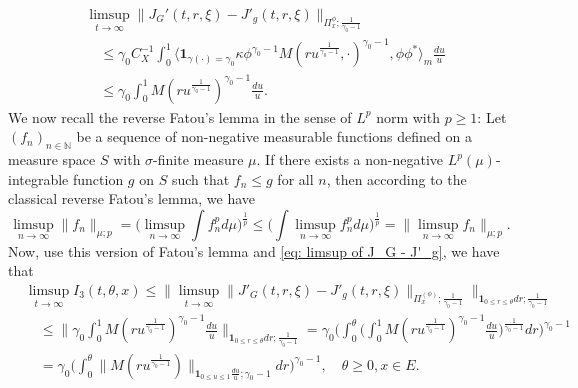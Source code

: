 \documentclass[12pt, a4paper]{amsart}
\theoremstyle{definition}
\numberwithin{equation}{section}
\begin{document}
\[\label{eq: limsup of J_G - J'_g}\begin{split}
	&\limsup_{t\to \infty} \| J_G'(t,r,\xi) - J'_g(t,r,\xi) \|_{\Pi_x^{\phi};\frac{1}{\gamma_0 - 1}}
	\\&\quad\leq  \gamma_0 C_X^{-1} \int_0^1 \big\langle \mathbf 1_{\gamma(\cdot) = \gamma_0} \kappa \phi^{\gamma_0 - 1} M(ru^{\frac{1}{\gamma_0 - 1}},\cdot)^{\gamma_0 - 1}, \phi\phi^* \big\rangle_m \frac{du}{u}
	\\&\quad\leq  \gamma_0  \int_0^1  M(ru^{\frac{1}{\gamma_0 - 1}})^{\gamma_0 - 1} \frac{du}{u}.
\end{split}\]
	We now recall the reverse Fatou's lemma in the sense of $L^p$ norm with $p\geq 1$: Let $(f_n)_{n\in \mathbb N}$ be a sequence of non-negative measurable functions defined on a measure space $S$ with $\sigma$-finite measure $\mu$. If there exists a non-negative $L^p(\mu)$-integrable function $g$ on $S$ such that $f_n \leq g$ for all $n$, then according to the classical reverse Fatou's lemma, we have
\[
	\limsup_{n\to \infty}\big\| f_n \big\|_{\mu;p}
	= \big (   \limsup_{n\to \infty}  \int f^p_n d\mu        \big)^{\frac{1}{p}}
	\leq  \big (   \int \limsup_{n\to \infty} f^p_n d\mu        \big)^{\frac{1}{p}}
	= \big\| \limsup_{n\to \infty} f_n \big\|_{\mu;p}.
\]
	Now, use this version of Fatou's lemma and \eqref{eq: limsup of J_G - J'_g}, we have that
\[\begin{split}
	&\limsup_{t\to \infty} I_3(t,\theta, x)
	\leq \big\| \limsup_{t\to \infty} \|    J'_G(t,r,\xi) - J'_g(t,r,\xi) \|_{\Pi_x^{(\phi)};\frac{1}{\gamma_0 - 1}} \big\|_{\mathbf 1_{0\leq r\leq \theta} dr;\frac{1}{\gamma_0 - 1}}
	\\&\quad\leq \Big\| \gamma_0  \int_0^1  M(ru^{\frac{1}{\gamma_0 - 1}})^{\gamma_0 - 1} \frac{du}{u} \Big\|_{\mathbf 1_{0\leq r\leq \theta} dr;\frac{1}{\gamma_0 - 1}}
	= \gamma_0 \bigg( \int_0^\theta \Big (   \int_0^1  M(ru^{\frac{1}{\gamma_0 - 1}})^{\gamma_0 - 1} \frac{du}{u}   \Big )^{\frac{1}{\gamma_0 - 1}} dr \bigg)^{\gamma_0 - 1}
	\\&\quad = \gamma_0 \Big(  \int_0^\theta  \| M(r u^{\frac{1}{\gamma_0 - 1}}) \|_{\mathbf 1_{0\leq u\leq 1}\frac{du}{u};\gamma_0 - 1}  dr\Big)^{\gamma_0 - 1},
	\quad \theta \geq 0, x\in E.
\end{split}\]
	
\end{document}
